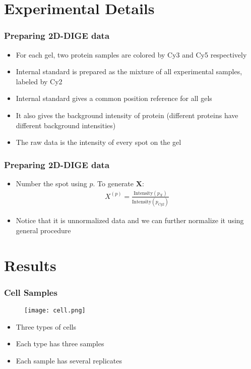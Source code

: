 \documentclass{beamer}
\begin{document}
\section{Experimental Details}
\begin{frame}
\frametitle{Preparing 2D-DIGE data}
\begin{itemize}
\item For each gel, two protein samples are colored by Cy3 and Cy5 respectively
\item Internal standard is prepared as the mixture of all experimental samples, labeled by Cy2
\item Internal standard gives a common position reference for all gels
\item It also gives the background intensity of protein (different proteins have different background intensities)
\item The raw data is the intensity of every spot on the gel
\end{itemize}
\end{frame}

\begin{frame}
\frametitle{Preparing 2D-DIGE data}
\begin{itemize}
\item Number the spot using $p$. To generate $\mathbf{X}$:
\begin{align*}
  X^{(p)} = \frac{\text{Intensity}(p_X)}{\text{Intensity}(p_{Cy2})}
\end{align*}
\item Notice that it is unnormalized data and we can further normalize it using general procedure
\end{itemize}
\end{frame}

\section{Results}
\begin{frame}
\frametitle{Cell Samples}
\begin{figure}
\texttt{[image: cell.png]}
\end{figure}
\begin{itemize}
\item Three types of cells
\item Each type has three samples
\item Each sample has several replicates
\end{itemize}
\end{frame}
\end{document}
